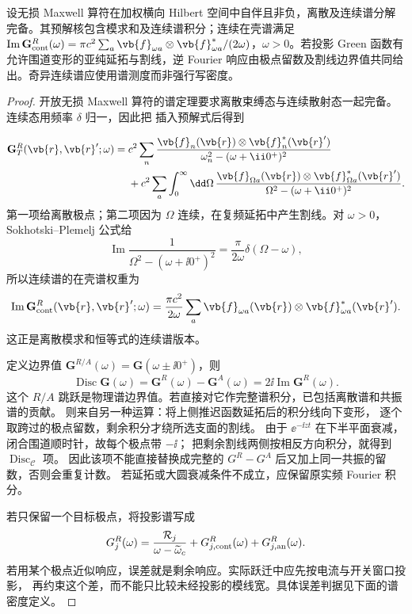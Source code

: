 \begin{proposition}
设无损 Maxwell 算符在加权横向 Hilbert 空间中自伴且非负，离散及连续谱分解完备。其预解核包含模求和及连续谱积分；连续在壳谱满足 $\operatorname{Im}\mathbf G_{\rm cont}^R(\omega)=\pi c^2\sum_a\vb{f}_{\omega a}\otimes\vb{f}_{\omega a}^*/(2\omega)$，$\omega>0$。若投影 Green 函数有允许围道变形的亚纯延拓与割线，逆 Fourier 响应由极点留数及割线边界值共同给出。奇异连续谱应使用谱测度而非强行写密度。
\end{proposition}
\begin{proof}
开放无损 Maxwell 算符的谱定理要求离散束缚态与连续散射态一起完备。连续态用频率 $\delta$ 归一，因此把 插入预解式后得到

\[
\begin{aligned}
\mathbf G_T^R(\vb{r},\vb{r}';\omega)
={}&c^2\sum_n
\frac{\vb{f}_n(\vb{r})\otimes\vb{f}_n^*(\vb{r}')}
{\omega_n^2-(\omega+\ii0^+)^2}\\
&+c^2\sum_a\int_0^\infty\dd\Omega\,
\frac{\vb{f}_{\Omega a}(\vb{r})\otimes\vb{f}_{\Omega a}^*(\vb{r}')}
{\Omega^2-(\omega+\ii0^+)^2}.
\end{aligned}
\]
第一项给离散极点；第二项因为 $\Omega$ 连续，在复频延拓中产生割线。对 $\omega>0$，Sokhotski--Plemelj 公式给
\[
\operatorname{Im}\frac1{\Omega^2-(\omega+\ii0^+)^2}
=\frac{\pi}{2\omega}\delta(\Omega-\omega),
\]
所以连续谱的在壳谱权重为
\[
\operatorname{Im}\mathbf G_{\rm cont}^R(\vb{r},\vb{r}';\omega)
=\frac{\pi c^2}{2\omega}
\sum_a\vb{f}_{\omega a}(\vb{r})
\otimes\vb{f}_{\omega a}^*(\vb{r}').
\]
这正是离散模求和恒等式的连续谱版本。

定义边界值
$\mathbf G^{R/A}(\omega)=\mathbf G(\omega\pm\ii0^+)$，则
\[
\operatorname{Disc}\mathbf G(\omega)
=\mathbf G^R(\omega)-\mathbf G^A(\omega)
=2\ii\operatorname{Im}\mathbf G^R(\omega).
\]
这个 $R/A$ 跳跃是物理谱边界值。若直接对它作完整谱积分，已包括离散谱和共振谱的贡献。
 则来自另一种运算：将上侧推迟函数延拓后的积分线向下变形，
逐个取跨过的极点留数，剩余积分才绕所选支面的割线。
由于 $\ee^{-\ii zt}$ 在下半平面衰减，闭合围道顺时针，故每个极点带 $-\ii$；
把剩余割线两侧按相反方向积分，就得到 $\operatorname{Disc}_{\mathcal C}$ 项。
因此该项不能直接替换成完整的 $G^R-G^A$ 后又加上同一共振的留数，否则会重复计数。
若延拓或大圆衰减条件不成立，应保留原实频 Fourier 积分。

若只保留一个目标极点，将投影谱写成
\[
G_j^R(\omega)
=\frac{\mathcal R_j}{\omega-\widetilde\omega_c}
+G_{j,\mathrm{cont}}^R(\omega)+G_{j,\rm an}^R(\omega).
\]
若用某个极点近似响应，误差就是剩余响应。实际跃迁中应先按电流与开关窗口投影，
再约束这个差，而不能只比较未经投影的模线宽。具体误差判据见下面的谱密度定义。
\end{proof}

